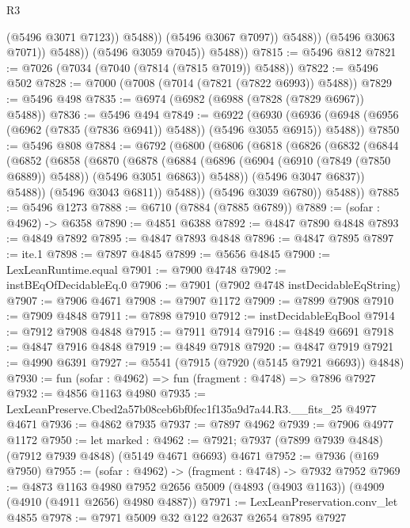 \begin{lexlean}{R3}
\begin{coremodule}
                            (@5496 @3071 @7123))
                          @5488))
                      (@5496 @3067 @7097))
                    @5488))
                (@5496 @3063 @7071))
              @5488))
          (@5496 @3059 @7045))
        @5488))
@7815 := @5496 @812
@7821 := @7026 (@7034 (@7040 (@7814 (@7815 @7019)) @5488))
@7822 := @5496 @502
@7828 := @7000 (@7008 (@7014 (@7821 (@7822 @6993)) @5488))
@7829 := @5496 @498
@7835 := @6974 (@6982 (@6988 (@7828 (@7829 @6967)) @5488))
@7836 := @5496 @494
@7849 := @6922
    (@6930 (@6936 (@6948 (@6956 (@6962 (@7835 (@7836 @6941)) @5488)) (@5496 @3055 @6915)) @5488))
@7850 := @5496 @808
@7884 := @6792
    (@6800
      (@6806
        (@6818
          (@6826
            (@6832
              (@6844
                (@6852
                  (@6858
                    (@6870
                      (@6878
                        (@6884
                          (@6896 (@6904 (@6910 (@7849 (@7850 @6889)) @5488)) (@5496 @3051 @6863))
                          @5488))
                      (@5496 @3047 @6837))
                    @5488))
                (@5496 @3043 @6811))
              @5488))
          (@5496 @3039 @6780))
        @5488))
@7885 := @5496 @1273
@7888 := @6710 (@7884 (@7885 @6789))
@7889 := (sofar : @4962) -> @6358
@7890 := @4851 @6388
@7892 := @4847 @7890 @4848
@7893 := @4849 @7892
@7895 := @4847 @7893 @4848
@7896 := @4847 @7895
@7897 := ite.{1}
@7898 := @7897 @4845
@7899 := @5656 @4845
@7900 := LexLeanRuntime.equal
@7901 := @7900 @4748
@7902 := instBEqOfDecidableEq.{0}
@7906 := @7901 (@7902 @4748 instDecidableEqString)
@7907 := @7906 @4671
@7908 := @7907 @1172
@7909 := @7899 @7908
@7910 := @7909 @4848
@7911 := @7898 @7910
@7912 := instDecidableEqBool
@7914 := @7912 @7908 @4848
@7915 := @7911 @7914
@7916 := @4849 @6691
@7918 := @4847 @7916 @4848
@7919 := @4849 @7918
@7920 := @4847 @7919
@7921 := @4990 @6391
@7927 := @5541 (@7915 (@7920 (@5145 @7921 @6693)) @4848)
@7930 := fun (sofar : @4962) => fun (fragment : @4748) => @7896 @7927
@7932 := @4856 @1163 @4980
@7935 := LexLeanPreserve.Cbed2a57b08ceb6bf0fec1f135a9d7a44.R3.__fits_25 @4977 @4671
@7936 := @4862 @7935
@7937 := @7897 @4962
@7939 := @7906 @4977 @1172
@7950 := let marked : @4962 := @7921;
  @7937 (@7899 @7939 @4848) (@7912 @7939 @4848) (@5149 @4671 @6693) @4671
@7952 := @7936 (@169 @7950)
@7955 := (sofar : @4962) -> (fragment : @4748) -> @7932 @7952
@7969 := @4873
    @1163
    @4980
    @7952
    @2656
    @5009
    (@4893 (@4903 @1163))
    (@4909 (@4910 (@4911 @2656) @4980 @4887))
@7971 := LexLeanPreservation.conv_let @4855
@7978 := @7971 @5009 @32 @122 @2637 @2654 @7895 @7927

\end{coremodule}
\end{lexlean}
